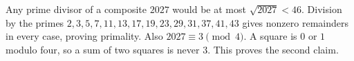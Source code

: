 Any prime divisor of a composite $2027$ would be at most $\sqrt{2027}<46$. Division by the primes $2,3,5,7,11,13,17,19,23,29,31,37,41,43$ gives nonzero remainders in every case, proving primality. Also $2027\equiv3\pmod4$. A square is $0$ or $1$ modulo four, so a sum of two squares is never $3$. This proves the second claim.
